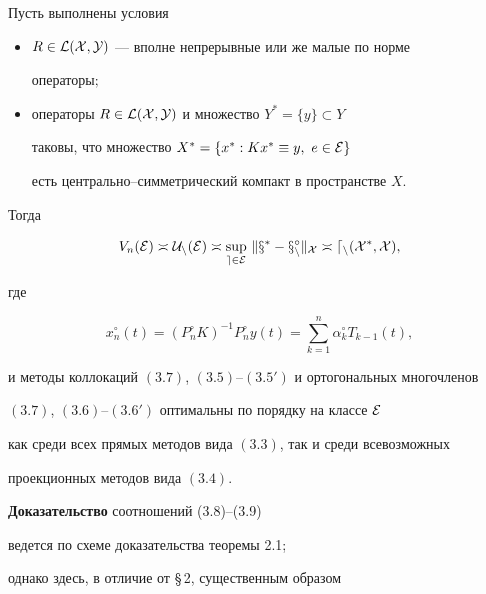 \begin{thms}


Пусть выполнены условия


\begin{itemize}


\item[а)] $R\in \cal L(X,Y)$ --- вполне непрерывные или же малые по норме


операторы$;$


\item[б)] операторы $R\in \cal L(X,Y)$ и множество $Y^*=\{ y\}\subset Y$


таковы, что множество $X^*=\{ x^* : Kx^*\equiv y,\ e\in \cal E\}$


есть центрально--симметрический компакт в пространстве $X$.


\end{itemize}


Тогда


\begin{equation}


V_n(\cal E)\asymp U_n(\cal E)\asymp \sup_{e\in \cal E}\,


\|x^*-x_n^\circ\|_X \asymp d_n(X^*,X),


\end{equation}


где


\begin{equation}


x_n^\circ (t)=(P_n^\circ K)^{-1} P_n^\circ y(t)=


\sum_{k=1}^n\alpha_k^\circ T_{k-1}(t),


\end{equation}


и методы коллокаций $(3.7)$, $(3.5)$--$(3.5')$ и ортогональных многочленов


$(3.7)$, $(3.6)$--$(3.6')$ оптимальны по порядку на классе $\cal E$


как среди всех прямых методов вида $(3.3)$, так и среди всевозможных


проекционных методов вида $(3.4)$.


\end{thms}





{\bf Доказательство} соотношений (3.8)--(3.9)


ведется по схеме доказательства теоремы 2.1;


однако здесь, в отличие от \S\,2, существенным образом


